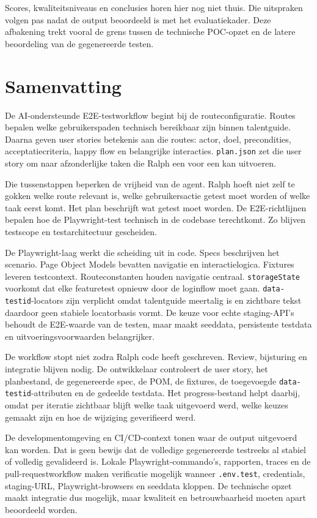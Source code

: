 Scores, kwaliteitsniveaus en conclusies horen hier nog niet thuis. Die uitspraken volgen pas nadat de output beoordeeld is met het evaluatiekader. Deze afbakening trekt vooral de grens tussen de technische POC-opzet en de latere beoordeling van de gegenereerde testen.

\section{Samenvatting}

De AI-ondersteunde E2E-testworkflow begint bij de routeconfiguratie. Routes bepalen welke gebruikerspaden technisch bereikbaar zijn binnen talentguide. Daarna geven user stories betekenis aan die routes: actor, doel, precondities, acceptatiecriteria, happy flow en belangrijke interacties. \texttt{plan.json} zet die user story om naar afzonderlijke taken die Ralph een voor een kan uitvoeren.

Die tussenstappen beperken de vrijheid van de agent. Ralph hoeft niet zelf te gokken welke route relevant is, welke gebruikersactie getest moet worden of welke taak eerst komt. Het plan beschrijft wat getest moet worden. De E2E-richtlijnen bepalen hoe de Playwright-test technisch in de codebase terechtkomt. Zo blijven testscope en testarchitectuur gescheiden.

De Playwright-laag werkt die scheiding uit in code. Specs beschrijven het scenario. Page Object Models bevatten navigatie en interactielogica. Fixtures leveren testcontext. Routeconstanten houden navigatie centraal. \texttt{storageState} voorkomt dat elke featuretest opnieuw door de loginflow moet gaan. \texttt{data-testid}-locators zijn verplicht omdat talentguide meertalig is en zichtbare tekst daardoor geen stabiele locatorbasis vormt. De keuze voor echte staging-API's behoudt de E2E-waarde van de testen, maar maakt seeddata, persistente testdata en uitvoeringsvoorwaarden belangrijker.

De workflow stopt niet zodra Ralph code heeft geschreven. Review, bijsturing en integratie blijven nodig. De ontwikkelaar controleert de user story, het planbestand, de gegenereerde spec, de POM, de fixtures, de toegevoegde \texttt{data-testid}-attributen en de gedeelde testdata. Het progress-bestand helpt daarbij, omdat per iteratie zichtbaar blijft welke taak uitgevoerd werd, welke keuzes gemaakt zijn en hoe de wijziging geverifieerd werd.

De developmentomgeving en CI/CD-context tonen waar de output uitgevoerd kan worden. Dat is geen bewijs dat de volledige gegenereerde testreeks al stabiel of volledig gevalideerd is. Lokale Playwright-commando's, rapporten, traces en de pull-requestworkflow maken verificatie mogelijk wanneer \texttt{.env.test}, credentials, staging-URL, Playwright-browsers en seeddata kloppen. De technische opzet maakt integratie dus mogelijk, maar kwaliteit en betrouwbaarheid moeten apart beoordeeld worden.

